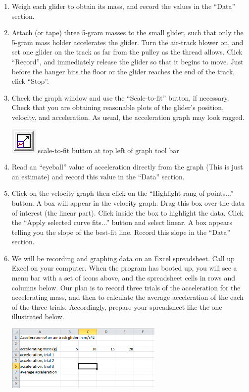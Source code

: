 \begin{enumerate}[label=\arabic*.]

\item Weigh each glider to obtain its mass, and record the values in the ``Data'' section.

\item Attach (or tape) three 5-gram masses to the small glider, such that only the 5-gram mass holder accelerates the glider.  
Turn the air-track blower on, and set one glider on the track as far from the pulley as the thread allows.  Click ``Record'', and immediately release the glider so that it begins to move.  Just before the hanger hits the floor or the glider reaches the end of the track, click ``Stop''.

\item Check the graph window and use the ``Scale-to-fit'' button, if necessary.  Check that you are obtaining reasonable plots of the glider's position, velocity, and acceleration.  As usual, the acceleration graph may look ragged.

\includegraphics*{imgs/6labs/6Alab/6Aexp3/6A_exp3_ScaleToFit2.png} scale-to-fit button at top left of graph tool bar

\item Read an ``eyeball'' value of acceleration directly from the graph (This is just an estimate) and record this value in the ``Data'' section.

\item Click on the velocity graph then click on the ``Highlight rang of points...'' button.  A box will appear in the velocity graph.  Drag this box over the data of interest (the linear part).  Click inside the box to highlight the data.  Click the ``Apply selected curve fits...'' button and select linear.  A box appears telling you the slope of the best-fit line.  Record this slope in the ``Data'' section.

\item We will be recording and graphing data on an Excel spreadsheet.  Call up Excel on your computer.  When the program has booted up, you will see a menu bar with a set of icons above, and the spreadsheet cells in rows and columns below.  Our plan is to record three trials of the acceleration for the accelerating mass, and then to calculate the average acceleration of the each of the three trials.  Accordingly, prepare your spreadsheet like the one illustrated below.
\begin{center} \includegraphics*[width=0.6\textwidth]{imgs/6labs/6Alab/6Aexp3/6A_exp3_Excel_Spreadsheet1.png} \end{center}


\end{enumerate}
